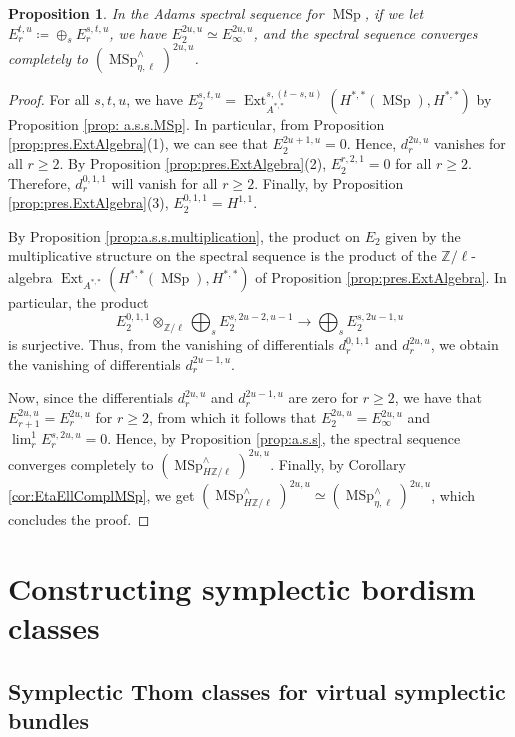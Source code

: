 \documentclass[10pt]{amsart}
\theoremstyle{definition}
\theoremstyle{plain}
\newtheorem{prop}[defn]{Proposition}
\numberwithin{equation}{section}
\newcommand{\0}{\emptyset}
\newcommand{\Z}{{\mathbb Z}}
\newcommand{\MSp}{{\operatorname{MSp}}}
\newcommand{\Ext}{{\operatorname{Ext}}}
\begin{document}
\begin{prop}
\label{prop:a.s.s.MSp2}
    In the Adams spectral sequence for $\MSp$, if we let $E_r^{t,u}\coloneqq \oplus_sE_r^{s,t,u}$, we have $E_2^{2u,u}\simeq E_\infty^{2u,u}$, and the spectral sequence converges completely to $(\MSp_{\eta,\ell}^\wedge)^{2u,u}$.
\end{prop}

\begin{proof}
    For all $s,t,u$, we have $E_2^{s,t,u}= \Ext_{A^{*,*}}^{s,(t-s,u)}(H^{*,*}(\MSp),H^{*,*})$ by Proposition \ref{prop: a.s.s.MSp}. In particular, from Proposition \ref{prop:pres.ExtAlgebra}(1), we can see that $E_2^{2u+1,u}=0$. Hence, $d_r^{2u,u}$ vanishes for all $r \ge 2$. By Proposition \ref{prop:pres.ExtAlgebra}(2), $E_2^{r,2,1}=0$ for all $r \ge 2$. Therefore, $d_r^{0,1,1}$ will vanish for all $r \ge 2$. Finally, by Proposition \ref{prop:pres.ExtAlgebra}(3), $E_2^{0,1,1}=H^{1,1}$.

    By Proposition \ref{prop:a.s.s.multiplication}, the product on $E_2$ given by the multiplicative structure on the spectral sequence is the product of the $\Z/\ell$-algebra $\Ext_{A^{*,*}}(H^{*,*}(\MSp),H^{*,*})$ of Proposition \ref{prop:pres.ExtAlgebra}. In particular, the product
    $$E_2^{0,1,1}\otimes_{\Z/\ell} \bigoplus_s E_2^{s,2u-2,u-1} \to \bigoplus_s E_2^{s,2u-1,u}$$
    is surjective. Thus, from the vanishing of differentials $d_r^{0,1,1}$ and $d_r^{2u,u}$, we obtain the vanishing of differentials $d_r^{2u-1,u}$.

    Now, since the differentials $d_r^{2u,u}$ and $d_r^{2u-1,u}$ are zero for $r\ge2$, we have that $E_{r+1}^{2u,u}=E_r^{2u,u}$ for $r \ge 2$, from which it follows that $E_2^{2u,u}=E_\infty^{2u,u}$ and $\lim_r^1E_r^{s,2u,u}=0$. Hence, by Proposition \ref{prop:a.s.s}, the spectral sequence converges completely to $(\MSp_{H\Z/\ell}^\wedge)^{2u,u}$. Finally, by Corollary \ref{cor:EtaEllComplMSp}, we get $(\MSp_{H\Z/\ell}^\wedge)^{2u,u} \simeq (\MSp_{\eta,\ell}^\wedge)^{2u,u}$, which concludes the proof.
\end{proof}

\section{Constructing symplectic bordism classes}

\subsection{Symplectic Thom classes for virtual symplectic bundles}
\end{document}

